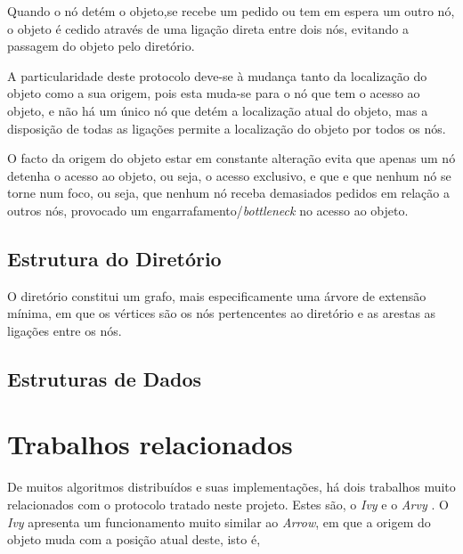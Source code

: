 Quando o nó detém o objeto,se recebe um pedido ou tem em espera um outro nó, o objeto é cedido através de uma ligação direta entre dois nós, evitando a passagem do objeto pelo diretório.

A particularidade deste protocolo deve-se à mudança tanto da localização do objeto como a sua origem, pois esta muda-se para o nó que tem o acesso ao objeto, e não há um único nó que detém a localização atual do objeto, mas a disposição de todas as ligações permite a localização do objeto por todos os nós.

O facto da origem do objeto estar em constante alteração evita que apenas um nó detenha o acesso ao objeto, ou seja, o acesso exclusivo, e que e que nenhum nó se torne num foco, ou seja, que nenhum nó receba demasiados pedidos em relação a outros nós, provocado um engarrafamento/\emph{bottleneck} no acesso ao objeto.




\subsection{Estrutura do Diretório}


O diretório constitui um grafo, mais especificamente uma árvore de extensão mínima, em que os vértices são os nós pertencentes ao diretório e as arestas as ligações entre os nós.


\begin{comment}
     elementos
     - Nodes
    vértices do grafo
     

     - Ligações entre os nodes (ligação de finds e ligação do MyChan, ver ARVY)
     explicar porque é que as ligações viram
     - envios do obj são diretos
\end{comment}

\subsection{Estruturas de Dados}


\section{Trabalhos relacionados}
De muitos algoritmos distribuídos e suas implementações, há dois trabalhos muito relacionados com o protocolo tratado neste projeto. Estes são, o \emph{Ivy} \cite{Ivy} e o \emph{Arvy} \cite{Arvy}.
O \emph{Ivy} apresenta um funcionamento muito similar ao \emph{Arrow}, em que a origem do objeto muda com a posição atual deste, isto é, 


